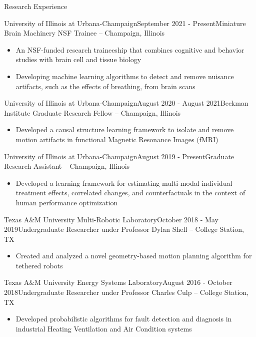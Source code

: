 \documentclass{resume} %
\begin{document}
\begin{rSection}{Research Experience}
\begin{rSubsection}{University of Illinois at Urbana-Champaign}{September 2021 - Present}{Miniature Brain Machinery NSF Trainee -- Champaign, Illinois} 

\begin{itemize}
    \item An NSF-funded research traineeship that combines cognitive and behavior studies with brain cell and tissue biology
    \item Developing machine learning algorithms to detect and remove nuisance artifacts, such as the effects of breathing, from brain scans
\end{itemize}
\end{rSubsection}
\begin{rSubsection}{University of Illinois at Urbana-Champaign}{August 2020 - August 2021}{Beckman Institute Graduate Research Fellow -- Champaign, Illinois} 

\begin{itemize}
    \item Developed a causal structure learning framework to isolate and remove motion artifacts in functional Magnetic Resonance Images (fMRI)
\end{itemize}
\end{rSubsection}
\begin{rSubsection}{University of Illinois at Urbana-Champaign}{August 2019 - Present}{Graduate Research Assistant -- Champaign, Illinois} 

\begin{itemize}
    \item Developed a learning framework for estimating multi-modal individual treatment effects, correlated changes, and counterfactuals in the context of human performance optimization
\end{itemize}
\end{rSubsection}
\begin{rSubsection}{Texas A\&M University Multi-Robotic Laboratory}{October 2018 - May 2019}{Undergraduate Researcher under Professor Dylan Shell -- College Station, TX}

\begin{itemize}
    \item Created and analyzed a novel geometry-based motion planning algorithm for tethered robots
\end{itemize}
\end{rSubsection}
\begin{rSubsection}{Texas A\&M University Energy Systems Laboratory}{August 2016 - October 2018}{Undergraduate Researcher under Professor Charles Culp -- College Station, TX}

\begin{itemize}
    \item Developed probabilistic algorithms for fault detection and diagnosis in industrial Heating Ventilation and Air Condition systems
\end{itemize}
\end{rSubsection}
\end{rSection}
\end{document}
